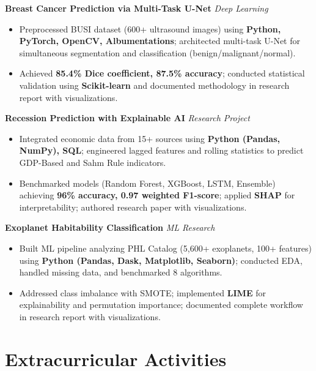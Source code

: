 \documentclass[10pt,a4paper]{article}
\newenvironment{project}{
    \begin{itemize}[leftmargin=1.0em, itemsep=1pt, topsep=1pt, parsep=1pt]
}{
    \end{itemize}
}
\begin{document}
\noindent\textbf{Breast Cancer Prediction via Multi-Task U-Net} \hfill \textit{Deep Learning}
\begin{project}
    \item Preprocessed BUSI dataset (600+ ultrasound images) using \textbf{Python, PyTorch, OpenCV, Albumentations}; architected multi-task U-Net for simultaneous segmentation and classification (benign/malignant/normal).
    \item Achieved \textbf{85.4\% Dice coefficient, 87.5\% accuracy}; conducted statistical validation using \textbf{Scikit-learn} and documented methodology in research report with visualizations.
\end{project}
\vspace{4pt}

\noindent\textbf{Recession Prediction with Explainable AI} \hfill \textit{Research Project}
\begin{project}
    \item Integrated economic data from 15+ sources using \textbf{Python (Pandas, NumPy), SQL}; engineered lagged features and rolling statistics to predict GDP-Based and Sahm Rule indicators.
    \item Benchmarked models (Random Forest, XGBoost, LSTM, Ensemble) achieving \textbf{96\% accuracy, 0.97 weighted F1-score}; applied \textbf{SHAP} for interpretability; authored research paper with visualizations.
\end{project}
\vspace{4pt}

\noindent\textbf{Exoplanet Habitability Classification} \hfill \textit{ML Research}
\begin{project}
    \item Built ML pipeline analyzing PHL Catalog (5,600+ exoplanets, 100+ features) using \textbf{Python (Pandas, Dask, Matplotlib, Seaborn)}; conducted EDA, handled missing data, and benchmarked 8 algorithms.
    \item Addressed class imbalance with SMOTE; implemented \textbf{LIME} for explainability and permutation importance; documented complete workflow in research report with visualizations.
\end{project}
\vspace{4pt}

\section*{Extracurricular Activities}
\end{document}
